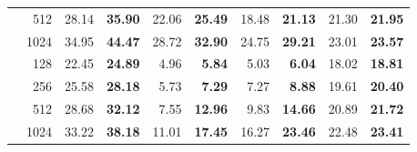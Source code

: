 \begin{tabular}{@{} l r rr rr rr rr @{}}
   & 512 & 28.14 & \textbf{35.90} & 22.06 & \textbf{25.49} & 18.48 & \textbf{21.13} & 21.30 & \textbf{21.95} \\
   & 1024 & 34.95 & \textbf{44.47} & 28.72 & \textbf{32.90} & 24.75 & \textbf{29.21} & 23.01 & \textbf{23.57} \\
  \midrule
   & 128 & 22.45 & \textbf{24.89} & 4.96 & \textbf{5.84} & 5.03 & \textbf{6.04} & 18.02 & \textbf{18.81} \\
   & 256 & 25.58 & \textbf{28.18} & 5.73 & \textbf{7.29} & 7.27 & \textbf{8.88} & 19.61 & \textbf{20.40} \\
   & 512 & 28.68 & \textbf{32.12} & 7.55 & \textbf{12.96} & 9.83 & \textbf{14.66} & 20.89 & \textbf{21.72} \\
   & 1024 & 33.22 & \textbf{38.18} & 11.01 & \textbf{17.45} & 16.27 & \textbf{23.46} & 22.48 & \textbf{23.41} \\
  \bottomrule
\end{tabular}
